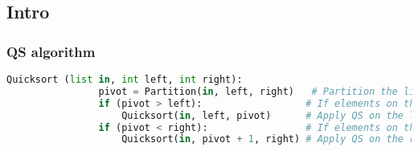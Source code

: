 \subsection{Intro}
    \subsubsection{QS algorithm}
    \begin{definition}
        \begin{lstlisting}[language=Python, caption={Quicksort Algorithm Pseudocode with Comments}]
            Quicksort (list in, int left, int right):
                pivot = Partition(in, left, right)   # Partition the list and return the pivot 
                if (pivot > left):                  # If elements on the LS of pivot
                    Quicksort(in, left, pivot)      # Apply QS on the left partition
                if (pivot < right):                 # If elements on the RS of pivot
                    Quicksort(in, pivot + 1, right) # Apply QS on the right partition
        \end{lstlisting}
    \end{definition}

